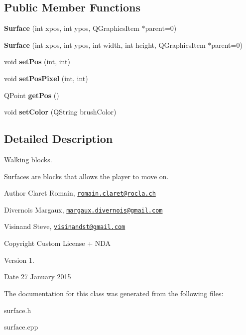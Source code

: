 \subsection*{Public Member Functions}
\begin{DoxyCompactItemize}
\item 
\hypertarget{class_surface_ac03bea7e4e17982fd17f8a571035a6f0}{}{\bfseries Surface} (int xpos, int ypos, Q\+Graphics\+Item $\ast$parent=0)\label{class_surface_ac03bea7e4e17982fd17f8a571035a6f0}

\item 
\hypertarget{class_surface_a3e1af81e4723f854196608b966a86415}{}{\bfseries Surface} (int xpos, int ypos, int width, int height, Q\+Graphics\+Item $\ast$parent=0)\label{class_surface_a3e1af81e4723f854196608b966a86415}

\item 
\hypertarget{class_surface_a025ed38853ae95be3c6fe8814711ffc3}{}void {\bfseries set\+Pos} (int, int)\label{class_surface_a025ed38853ae95be3c6fe8814711ffc3}

\item 
\hypertarget{class_surface_ab63590ebca0d813b110aa286400eac72}{}void {\bfseries set\+Pos\+Pixel} (int, int)\label{class_surface_ab63590ebca0d813b110aa286400eac72}

\item 
\hypertarget{class_surface_acbdbf91a4cca74bb9da6c8a2fa932cd7}{}Q\+Point {\bfseries get\+Pos} ()\label{class_surface_acbdbf91a4cca74bb9da6c8a2fa932cd7}

\item 
\hypertarget{class_surface_ab7dd076ec71f2d6a63fe60f6c011786b}{}void {\bfseries set\+Color} (Q\+String brush\+Color)\label{class_surface_ab7dd076ec71f2d6a63fe60f6c011786b}

\end{DoxyCompactItemize}


\subsection{Detailed Description}
Walking blocks. 

Surfaces are blocks that allows the player to move on. \begin{DoxyAuthor}{Author}
Claret Romain, \href{mailto:romain.claret@rocla.ch}{\tt romain.\+claret@rocla.\+ch} 

Divernois Margaux, \href{mailto:margaux.divernois@gmail.com}{\tt margaux.\+divernois@gmail.\+com} 

Visinand Steve, \href{mailto:visinandst@gmail.com}{\tt visinandst@gmail.\+com} 
\end{DoxyAuthor}
\begin{DoxyCopyright}{Copyright}
Custom License + N\+D\+A 
\end{DoxyCopyright}
\begin{DoxyVersion}{Version}
1. 
\end{DoxyVersion}
\begin{DoxyDate}{Date}
27 January 2015 
\end{DoxyDate}


The documentation for this class was generated from the following files\+:\begin{DoxyCompactItemize}
\item 
surface.\+h\item 
surface.\+cpp\end{DoxyCompactItemize}
